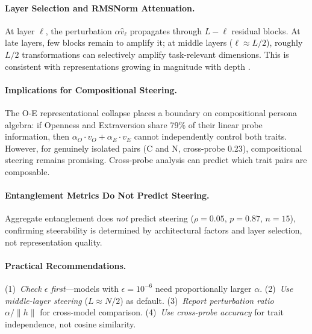 \documentclass{article}
\begin{document}
\paragraph{Layer Selection and RMSNorm Attenuation.}
At layer $\ell$, the perturbation $\alpha \hat{v}_\ell$ propagates through $L - \ell$ residual blocks. At late layers, few blocks remain to amplify it; at middle layers ($\ell \approx L/2$), roughly $L/2$ transformations can selectively amplify task-relevant dimensions. This is consistent with representations growing in magnitude with depth \citep{godey2024anisotropy}.

\paragraph{Implications for Compositional Steering.}
The O-E representational collapse places a boundary on compositional persona algebra: if Openness and Extraversion share 79\% of their linear probe information, then $\alpha_O \cdot v_O + \alpha_E \cdot v_E$ cannot independently control both traits. However, for genuinely isolated pairs (C and N, cross-probe 0.23), compositional steering remains promising. Cross-probe analysis can predict which trait pairs are composable.

\paragraph{Entanglement Metrics Do Not Predict Steering.}
Aggregate entanglement does \emph{not} predict steering ($\rho{=}0.05$, $p{=}0.87$, $n{=}15$), confirming steerability is determined by architectural factors and layer selection, not representation quality.

\paragraph{Practical Recommendations.}
(1)~\emph{Check $\epsilon$ first}---models with $\epsilon{=}10^{-6}$ need proportionally larger $\alpha$. (2)~\emph{Use middle-layer steering} ($L \approx N/2$) as default. (3)~\emph{Report perturbation ratio} $\alpha/\|h\|$ for cross-model comparison. (4)~\emph{Use cross-probe accuracy} for trait independence, not cosine similarity.
\end{document}
